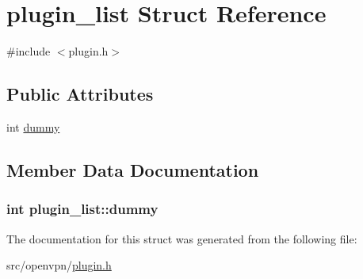 \hypertarget{structplugin__list}{}\section{plugin\+\_\+list Struct Reference}
\label{structplugin__list}


{\ttfamily \#include $<$plugin.\+h$>$}

\subsection*{Public Attributes}
\begin{DoxyCompactItemize}
\item 
int \hyperlink{structplugin__list_aaa23c11e55f8f13a7e57ad9d008927b3}{dummy}
\end{DoxyCompactItemize}


\subsection{Member Data Documentation}
\hypertarget{structplugin__list_aaa23c11e55f8f13a7e57ad9d008927b3}{}
\subsubsection[{dummy}]{\setlength{\rightskip}{0pt plus 5cm}int plugin\+\_\+list\+::dummy}\label{structplugin__list_aaa23c11e55f8f13a7e57ad9d008927b3}


The documentation for this struct was generated from the following file\+:\begin{DoxyCompactItemize}
\item 
src/openvpn/\hyperlink{plugin_8h}{plugin.\+h}\end{DoxyCompactItemize}
